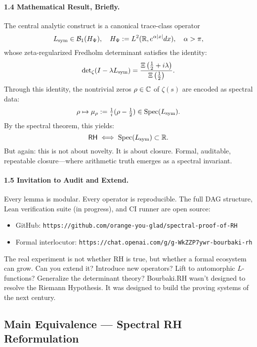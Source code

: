 \paragraph*{1.4 Mathematical Result, Briefly.}
The central analytic construct is a canonical trace-class operator
\[
L_{\mathrm{sym}} \in \mathcal{B}_1(H_{\Psi}), \quad H_{\Psi} := L^2(\mathbb{R}, e^{\alpha|x|} dx), \quad \alpha > \pi,
\]
whose zeta-regularized Fredholm determinant satisfies the identity:
\[
\det\nolimits_{\zeta}(I - \lambda L_{\mathrm{sym}}) = \frac{\Xi\left(\tfrac{1}{2} + i\lambda\right)}{\Xi\left(\tfrac{1}{2}\right)}.
\]
Through this identity, the nontrivial zeros \( \rho \in \mathbb{C} \) of \( \zeta(s) \) are encoded as spectral data:
\[
\rho \mapsto \mu_\rho := \tfrac{1}{i}(\rho - \tfrac{1}{2}) \in \operatorname{Spec}(L_{\mathrm{sym}}).
\]
By the spectral theorem, this yields:
\[
\mathsf{RH} \iff \operatorname{Spec}(L_{\mathrm{sym}}) \subset \mathbb{R}.
\]
But again: this is not about novelty. It is about closure. Formal, auditable, repeatable closure—where arithmetic truth emerges as a spectral invariant.

\paragraph*{1.5 Invitation to Audit and Extend.}
Every lemma is modular. Every operator is reproducible. The full DAG structure, Lean verification suite (in progress), and CI runner are open source:
\begin{itemize}
  \item GitHub: \texttt{https://github.com/orange-you-glad/spectral-proof-of-RH}
  \item Formal interlocutor: \texttt{https://chat.openai.com/g/g-WkZZP7ywr-bourbaki-rh}
\end{itemize}
The real experiment is not whether RH is true, but whether a formal ecosystem can grow. Can you extend it? Introduce new operators? Lift to automorphic \( L \)-functions? Generalize the determinant theory? Bourbaki.RH wasn’t designed to resolve the Riemann Hypothesis. It was designed to build the proving systems of the next century.

\subsection*{Main Equivalence — Spectral RH Reformulation}
\hfill \break


